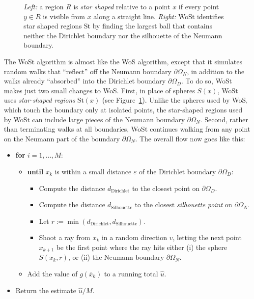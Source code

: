 \documentclass{article}
\newcommand{\figloc}[1]{\textit{#1}}
\newcommand{\St}{\text{St}}
\renewcommand{\vec}[1]{#1}
\begin{document}
\begin{figure}[h!]
   \centering
   
   

   \caption{\figloc{Left:} a region \(R\) is \emph{star shaped} relative to a point \(\vec{x}\) if every point \(\vec{y} \in R\) is visible from \(\vec{x}\) along a straight line. \figloc{Right:} WoSt identifies star shaped regions \(\St\) by finding the largest ball that contains neither the Dirichlet boundary nor the silhouette of the Neumann boundary.\label{fig:StarShapedRegions}}
\end{figure}

The WoSt algorithm is almost like the WoS algorithm, except that it simulates random walks that ``reflect'' off the Neumann boundary \(\partial\Omega_N\), in addition to the walks already ``absorbed'' into the Dirichlet boundary \(\partial\Omega_D\).  To do so, WoSt makes just two small changes to WoS.  First, in place of spheres \(S(\vec{x})\), WoSt uses \emph{star-shaped regions} \(\St(\vec{x})\) (see Figure~\ref{fig:StarShapedRegions}).  Unlike the spheres used by WoS, which touch the boundary only at isolated points, the star-shaped regions used by WoSt can include large pieces of the Neumann boundary \(\partial\Omega_N\).  Second, rather than terminating walks at all boundaries, WoSt continues walking from any point on the Neumann part of the boundary \(\partial\Omega_N\).  The overall flow now goes like this:

\begin{itemize}
   \item \textbf{for} \(i = 1, \ldots, M\):
\begin{itemize}
   \item \textbf{until} \(\vec{x}_k\) is within a small distance \(\varepsilon\) of the Dirichlet boundary \(\partial\Omega_D\):
      \begin{itemize}
         \item Compute the distance \(d_{\text{Dirichlet}}\) to the closest point on \(\partial\Omega_D\).
         \item Compute the distance \(d_{\text{Silhouette}}\) to the closest \emph{silhouette point} on \(\partial\Omega_N\).
         \item Let \(r := \min(d_{\text{Dirichlet}},d_{\text{Silhouette}})\).
         \item Shoot a ray from \(\vec{x}_k\) in a random direction \(v\), letting the next point \(\vec{x}_{k+1}\) be the first point where the ray hits either (i) the sphere \(S(\vec{x}_k,r)\), or (ii) the Neumann boundary \(\partial\Omega_N\).
      \end{itemize}
   \item Add the value of \(g(\overline{\vec{x}}_k)\) to a running total \(\widehat{u}\).
\end{itemize}
   \item Return the estimate \(\widehat{u}/M\).
\end{itemize}
\end{document}
